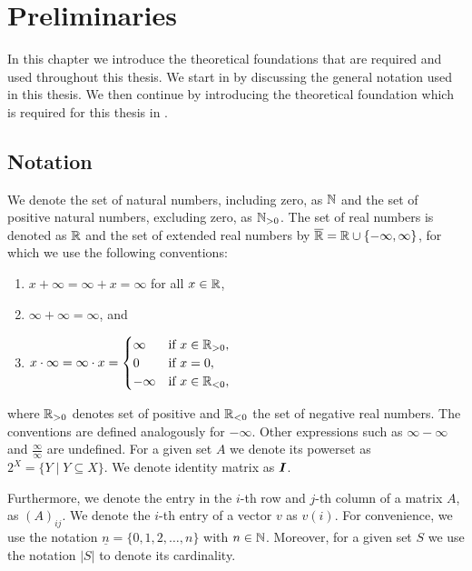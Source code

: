 \chapter{Preliminaries}
\label{ch:preliminaries}
In this chapter we introduce the theoretical foundations that are required and used throughout this thesis.
We start in  by discussing the general notation used in this thesis.
We then continue by introducing the theoretical foundation which is required for this thesis in .


\section{Notation}\label{sec:notation}
We denote the set of natural numbers, including zero, as $\mathbb{N}$ and the set of positive natural numbers, excluding zero, as $\mathbb{N}_{> 0}$. The set of real numbers is denoted as $\mathbb{R}$ and the set of extended real numbers by $\overline{\mathbb{R}} = \mathbb{R} \cup \{-\infty,\infty\}$, for which we use the following conventions:
\begin{enumerate}[label=(\roman*)]
    \item $x + \infty = \infty + x = \infty$ for all $x \in \mathbb{R}$,
    \item $\infty + \infty = \infty$, and
    \item $x \cdot \infty = \infty \cdot x =
        \begin{cases}
            \infty  & \text{if } x \in \mathbb{R}_{> 0},\\
            0       & \text{if } x = 0,\\
            -\infty & \text{if } x \in \mathbb{R}_{< 0},
        \end{cases}$
\end{enumerate}
where $\mathbb{R}_{> 0}$ denotes set of positive and $\mathbb{R}_{< 0}$ the set of negative real numbers.
The conventions are defined analogously for $-\infty$. Other expressions such as $\infty-\infty$ and $\frac{\infty}{\infty}$ are undefined. 
For a given set $A$ we denote its powerset as $2^X = \{Y \mid Y \subseteq X\}$. We denote identity matrix as $\bm{I}$.

Furthermore, we denote the entry in the $i$-th row and $j$-th column of a matrix $A$, as $(A)_{ij}$. We denote the $i$-th entry of a vector $v$ as $v(i)$.
For convenience, we use the notation $\underline{n} = \{0, 1, 2, \dots, n\}$ with $n\in \mathbb{N}$. 
Moreover, for a given set $S$ we use the notation $|S|$ to denote its cardinality.

